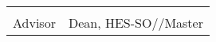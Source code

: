 { \renewcommand{\arraystretch}{1.5}
\begin{tabularx}{\textwidth}{X X}
	\Advisor  & \Dean\\
	Advisor   & Dean, HES-SO//Master\\
\end{tabularx}
}

%
%
%
%
%
%
%
%
%
%
%
%
%
%
%
%
%
%
%
